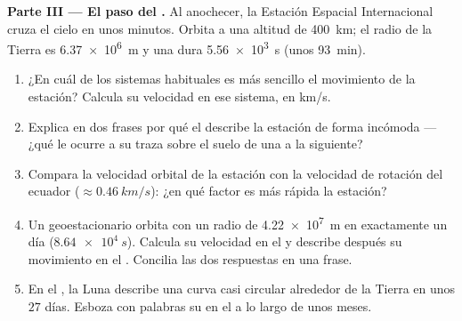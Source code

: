 \begin{problem}
\medskip
\noindent\textbf{Parte III --- El paso del .}
Al anochecer, la Estación Espacial Internacional cruza el cielo en unos
minutos. Orbita a una altitud de \qty{400}{km}; el radio de la Tierra es
\qty{6.37e6}{m} y una  dura \qty{5.56e3}{s} (unos
\qty{93}{min}).
\begin{enumerate}[resume]
  \item ¿En cuál de los sistemas habituales es más sencillo el
        movimiento de la estación? Calcula su velocidad en ese sistema,
        en \unit{km/s}.
  \item Explica en dos frases por qué el  describe la
        estación de forma incómoda --- ¿qué le ocurre a su traza sobre
        el suelo de una  a la siguiente?
  \item Compara la velocidad orbital de la estación con la velocidad de
        rotación del ecuador ($\approx \qty{0.46}{km/s}$): ¿en qué
        factor es más rápida la estación?
  \item Un  geoestacionario orbita con un radio de
        \qty{4.22e7}{m} en exactamente un día ($\qty{8.64e4}{s}$).
        Calcula su velocidad en el  y describe
        después su movimiento en el . Concilia las dos
        respuestas en una frase.
  \item En el , la Luna describe una curva casi
        circular alrededor de la Tierra en unos $27$ días. Esboza con
        palabras su  en el  a lo largo
        de unos meses.
\end{enumerate}


\end{problem}
